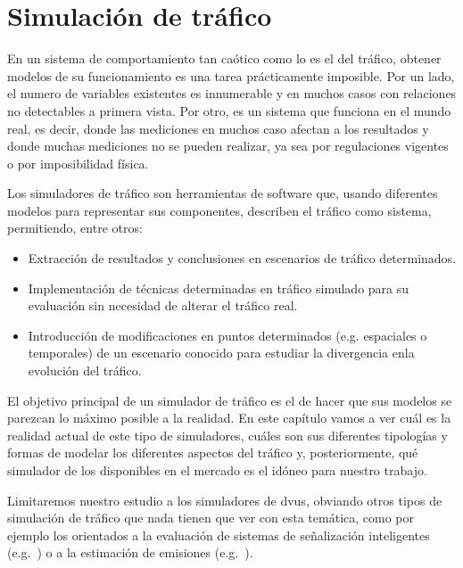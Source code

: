 \chapter{Simulación de tráfico}
\label{ch:sota-traffic-simulation}

En un sistema de comportamiento tan caótico como lo es el del tráfico, obtener modelos de su funcionamiento es una tarea prácticamente imposible. Por un lado, el numero de variables existentes es innumerable y en muchos casos con relaciones no detectables a primera vista. Por otro, es un sistema que funciona en el mundo real, es decir, donde las mediciones en muchos caso afectan a los resultados y donde muchas mediciones no se pueden realizar, ya sea por regulaciones vigentes o por imposibilidad física.

Los simuladores de tráfico son herramientas de software que, usando diferentes modelos para representar sus componentes, describen el tráfico como sistema, permitiendo, entre otros:

\begin{itemize}
	\item Extracción de resultados y conclusiones en escenarios de tráfico determinados.
	\item Implementación de técnicas determinadas en tráfico simulado para su evaluación sin necesidad de alterar el tráfico real.
	\item Introducción de modificaciones en puntos determinados (e.g. espaciales o temporales) de un escenario conocido para estudiar la divergencia enla evolución del tráfico.
\end{itemize}

El objetivo principal de un simulador de tráfico es el de hacer que sus modelos se parezcan lo máximo posible a la realidad. En este capítulo vamos a ver cuál es la realidad actual de este tipo de simuladores, cuáles son sus diferentes tipologías y formas de modelar los diferentes aspectos del tráfico y, posteriormente, qué simulador de los disponibles en el mercado es el idóneo para nuestro trabajo.

Limitaremos nuestro estudio a los simuladores de \glspl{dvu}, obviando otros tipos de simulación de tráfico que nada tienen que ver con esta temática, como por ejemplo los orientados a la evaluación de sistemas de señalización inteligentes (e.g.~\cite{jin2016evaluation}) o a la estimación de emisiones (e.g.~\cite{quaassdorff2016microscale}).

